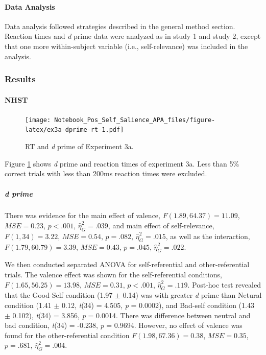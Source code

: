 \documentclass[
  english,
  man]{apa6}
\let\oldparagraph\paragraph
\renewcommand{\paragraph}[1]{\oldparagraph{#1}\mbox{}}
\let\oldsubparagraph\subparagraph
\renewcommand{\subparagraph}[1]{\oldsubparagraph{#1}\mbox{}}
\begin{document}
\hypertarget{data-analysis-6}{%
\paragraph{Data Analysis}\label{data-analysis-6}}

Data analysis followed strategies described in the general method section. Reaction times and \emph{d} prime data were analyzed as in study 1 and study 2, except that one more within-subject variable (i.e., self-relevance) was included in the analysis.

\hypertarget{results-5}{%
\subsubsection{Results}\label{results-5}}

\hypertarget{nhst-3}{%
\paragraph{NHST}\label{nhst-3}}

\begin{figure}
\centering
\texttt{[image: Notebook\_Pos\_Self\_Salience\_APA\_files/figure-latex/ex3a-dprime-rt-1.pdf]}
\caption{\label{fig:ex3a-dprime-rt}RT and \emph{d} prime of Experiment 3a.}
\end{figure}

Figure \ref{fig:ex3a-dprime-rt} shows \emph{d} prime and reaction times of experiment 3a. Less than 5\% correct trials with less than 200ms reaction times were excluded.

\hypertarget{d-prime-4}{%
\subparagraph{d prime}\label{d-prime-4}}

There was evidence for the main effect of valence, \(F(1.89, 64.37) = 11.09\), \(\mathit{MSE} = 0.23\), \(p < .001\), \(\hat{\eta}^2_G = .039\), and main effect of self-relevance, \(F(1, 34) = 3.22\), \(\mathit{MSE} = 0.54\), \(p = .082\), \(\hat{\eta}^2_G = .015\), as well as the interaction, \(F(1.79, 60.79) = 3.39\), \(\mathit{MSE} = 0.43\), \(p = .045\), \(\hat{\eta}^2_G = .022\).

We then conducted separated ANOVA for self-referential and other-referential trials. The valence effect was shown for the self-referential conditions, \(F(1.65, 56.25) = 13.98\), \(\mathit{MSE} = 0.31\), \(p < .001\), \(\hat{\eta}^2_G = .119\). Post-hoc test revealed that the Good-Self condition (1.97 \(\pm\) 0.14) was with greater \emph{d} prime than Netural condition (1.41 \(\pm\) 0.12, \emph{t}(34) = 4.505, \emph{p} = 0.0002), and Bad-self condition (1.43 \(\pm\) 0.102), \emph{t}(34) = 3.856, \emph{p} = 0.0014. There was difference between neutral and bad condition, \emph{t}(34) = -0.238, \emph{p} = 0.9694. However, no effect of valence was found for the other-referential condition \(F(1.98, 67.36) = 0.38\), \(\mathit{MSE} = 0.35\), \(p = .681\), \(\hat{\eta}^2_G = .004\).
\end{document}

